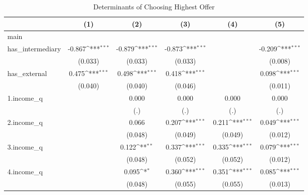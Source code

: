 \begin{table}[htbp]\centering
\def\sym#1{\ifmmode^{#1}\else\(^{#1}\)\fi}
\caption{Determinants of Choosing Highest Offer}
\begin{tabular}{l*{5}{c}}
\hline\hline
            &\multicolumn{1}{c}{(1)}         &\multicolumn{1}{c}{(2)}         &\multicolumn{1}{c}{(3)}         &\multicolumn{1}{c}{(4)}         &\multicolumn{1}{c}{(5)}         \\
\hline
main        &                     &                     &                     &                     &                     \\
has\_intermediary&      -0.867\sym{***}&      -0.879\sym{***}&      -0.873\sym{***}&                     &      -0.209\sym{***}\\
            &     (0.033)         &     (0.033)         &     (0.033)         &                     &     (0.008)         \\
[1em]
has\_external&       0.475\sym{***}&       0.498\sym{***}&       0.418\sym{***}&                     &       0.098\sym{***}\\
            &     (0.040)         &     (0.040)         &     (0.046)         &                     &     (0.011)         \\
[1em]
1.income\_q  &                     &       0.000         &       0.000         &       0.000         &       0.000         \\
            &                     &         (.)         &         (.)         &         (.)         &         (.)         \\
[1em]
2.income\_q  &                     &       0.066         &       0.207\sym{***}&       0.211\sym{***}&       0.049\sym{***}\\
            &                     &     (0.048)         &     (0.049)         &     (0.049)         &     (0.012)         \\
[1em]
3.income\_q  &                     &       0.122\sym{**} &       0.337\sym{***}&       0.335\sym{***}&       0.079\sym{***}\\
            &                     &     (0.048)         &     (0.052)         &     (0.052)         &     (0.012)         \\
[1em]
4.income\_q  &                     &       0.095\sym{*}  &       0.360\sym{***}&       0.351\sym{***}&       0.085\sym{***}\\
            &                     &     (0.048)         &     (0.055)         &     (0.055)         &     (0.013)         \\

\end{tabular}
\end{table}
